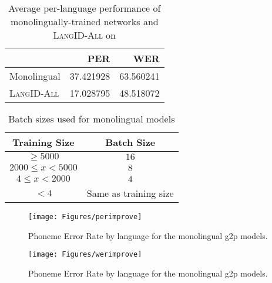 \begin{table}
\begin{tabular}{lrr}
\toprule
{} &        PER &        WER \\
\midrule
Monolingual  &  37.421928 &  63.560241 \\
\textsc{LangID-All} &  17.028795 &  48.518072 \\
\bottomrule
\end{tabular}
\caption{Average per-language performance of monolingually-trained networks and \textsc{LangID-All} on }
\end{table}

\begin{table}
\centering
\small
\begin{tabular}{|c|c|}
\hline
Training Size & Batch Size \\
\hline
$\geq 5000$ & $16$ \\
$2000 \leq x < 5000$ & $8$ \\
$4 \leq x < 2000$ & $4$ \\
$<4$ & Same as training size \\
\hline
\end{tabular}
\caption{Batch sizes used for monolingual models}
\label{table:batch}
\end{table}

\begin{figure}
\begin{center}
\texttt{[image: Figures/perimprove]}
\end{center}
\caption{Phoneme Error Rate by language for the monolingual g2p models.}
\label{figure:perimprove}
\end{figure}

\begin{figure}
\begin{center}
\texttt{[image: Figures/werimprove]}
\end{center}
\caption{Phoneme Error Rate by language for the monolingual g2p models.}
\label{figure:werimprove}
\end{figure}


